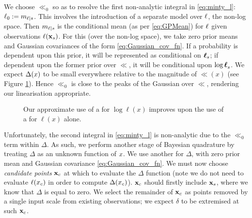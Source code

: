 \documentclass{article} %
\begin{document}
We choose $\ll_0$ so as to resolve the first non-analytic integral in \eqref{eq:minty_l}:  $\lfn_0 \deq  m_{\lfn|s}$. This involves the introduction of a separate \gpb model over $\lfn$, the non-log space.  Then $m_{\lfn|s}$ is the \gpb conditional mean (as per \eqref{eq:GPMean}) for $\lfn$ given observations $\lfn(\vlfv_s)$. For this \gpb (over the non-log space), we take zero prior means and Gaussian
covariances of the form \eqref{eq:Gaussian_cov_fn}. If a probability is dependent upon this \gpb prior, it will be represented as conditional on $\vl_s$; if dependent upon the former \gpb prior over $\ll$, it will be conditional upon $\vll_s$.
We expect $\Delta(\lfv)$ to be small everywhere relative to the magnitude of $\ll(x)$ (see Figure \ref{fig:delta}). Hence
 $\ll_0$ is close to the peaks of the Gaussian over $\ll$, rendering our linearisation appropriate. 
\begin{figure}
\centering
{}
\caption{Our approximate use of a \gpb for $\log \ell (x)$ improves upon the use of a \gpb for $\ell(x)$ alone.}
\label{fig:delta}
\end{figure}

Unfortunately, the second integral in \eqref{eq:minty_l} is non-analytic due to the $\ll_0$ term within $\Delta$. As such, we perform another stage of Bayesian quadrature by treating $\Delta$ as an unknown function of $\lfv$. We use another \gpb for $\Delta$, with zero prior mean and Gaussian covariance \eqref{eq:Gaussian_cov_fn}. We must now choose \emph{candidate points} $\vlfv_c$ at which to evaluate the $\Delta$ function (note we do not need to evaluate $\lfn(\lfv_c)$ in order to compute $\Delta(\lfv_c)$).
$\vlfv_c$ should firstly include $\vlfv_s$, where we know that $\Delta$ is equal to zero. We select the remainder of $\vlfv_c$ as points removed by a single input scale from existing observations; we expect $\delta$ to be extremised at such $\vlfv_c$. 
\end{document}
